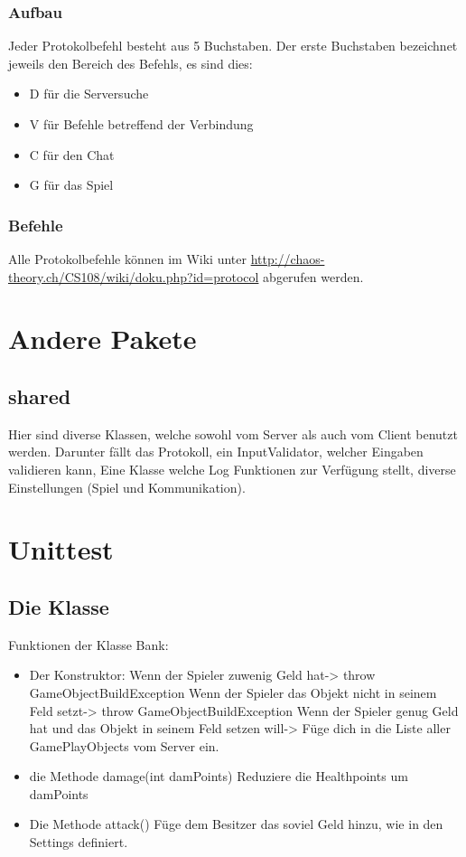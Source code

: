 \documentclass[ngerman, 12pt, pdftex]{scrartcl}[2006/07/30]
\begin{document}
\subsubsection{Aufbau}
Jeder Protokolbefehl besteht aus 5 Buchstaben. Der erste Buchstaben bezeichnet jeweils den Bereich des Befehls, es sind dies:
\begin{itemize}
\item D für die Serversuche
\item V für Befehle betreffend der Verbindung
\item C für den Chat
\item G für das Spiel
\end{itemize}
\subsubsection{Befehle}
Alle Protokolbefehle können im Wiki unter \url{http://chaos-theory.ch/CS108/wiki/doku.php?id=protocol} abgerufen werden.

\section{Andere Pakete}
\subsection{shared}
Hier sind diverse Klassen, welche sowohl vom Server als auch vom Client benutzt werden.
Darunter fällt das Protokoll, ein InputValidator, welcher Eingaben validieren kann, Eine Klasse welche Log Funktionen zur Verfügung stellt,
diverse Einstellungen (Spiel und Kommunikation).

\section{Unittest}
\subsection{Die Klasse}
Funktionen der Klasse Bank:
\begin{itemize}
\item Der Konstruktor: 
\subitem Wenn der Spieler zuwenig Geld hat-> throw GameObjectBuildException
\subitem Wenn der Spieler das Objekt nicht in seinem Feld setzt-> throw GameObjectBuildException
\subitem Wenn der Spieler genug Geld hat und das Objekt in seinem Feld setzen will-> F\"{u}ge dich in die Liste aller GamePlayObjects vom Server ein.
\item die Methode damage(int damPoints)
\subitem Reduziere die Healthpoints um damPoints
\item Die Methode attack()
\subitem F\"{u}ge dem Besitzer das soviel Geld hinzu, wie in den Settings definiert.
\end{itemize}
\end{document}
